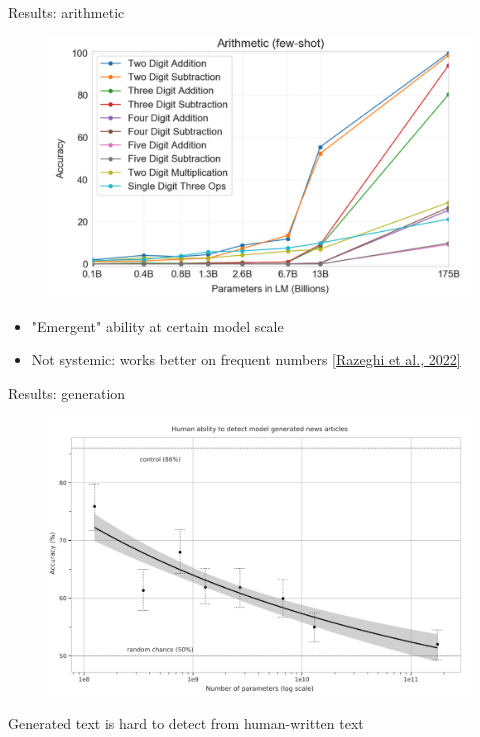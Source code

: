 \documentclass[usenames,dvipsnames,notes,11pt,aspectratio=169,hyperref={colorlinks=true, linkcolor=blue}]{beamer}
\begin{document}
\begin{frame}
    {Results: arithmetic}
    \begin{figure}
        \includegraphics[height=0.6\textheight]{figures/gpt3-arith}
    \end{figure}
    \begin{itemize}
        \item "Emergent" ability at certain model scale
        \item Not systemic: works better on frequent numbers \href{https://arxiv.org/abs/2202.07206}{[Razeghi et al., 2022]}
    \end{itemize}
\end{frame}

\begin{frame}
    {Results: generation}
    \begin{figure}
        \includegraphics[height=0.6\textheight]{figures/gpt3-gen}
    \end{figure}
    Generated text is hard to detect from human-written text
\end{frame}
\end{document}

